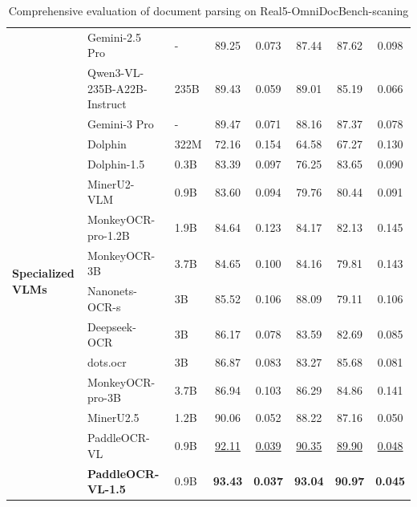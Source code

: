 \documentclass[11pt, a4paper,logo,  copyright, nonumbering]{paddleocr}
\begin{document}
\begin{table}[H]
{\begin{tabular}{l|ll|c|c c c c}
         & Gemini-2.5 Pro~\cite{gemini25} & - & 89.25 & 0.073 & 87.44 & 87.62 & 0.098 \\
         & Qwen3-VL-235B-A22B-Instruct~\cite{bai2025qwen2} & 235B & 89.43 & 0.059 & 89.01 & 85.19 & 0.066 \\
         & Gemini-3 Pro~\cite{gemini30} & - & 89.47 & 0.071 & 88.16 & 87.37 & 0.078 \\
        \midrule
        \multirow{10}{*}{\textbf{Specialized VLMs}} & Dolphin~\cite{feng2025dolphin} & 322M & 72.16 & 0.154 & 64.58 & 67.27 & 0.130 \\
         & Dolphin-1.5 ~\cite{feng2025dolphin} & 0.3B & 83.39 & 0.097 & 76.25 & 83.65 & 0.090 \\
         & MinerU2-VLM~\cite{MinerU2} & 0.9B & 83.60 & 0.094 & 79.76 & 80.44 & 0.091 \\
         & MonkeyOCR-pro-1.2B ~\cite{li2025monkeyocr} & 1.9B & 84.64 & 0.123 & 84.17 & 82.13 & 0.145 \\
         & MonkeyOCR-3B ~\cite{li2025monkeyocr} & 3.7B & 84.65 & 0.100 & 84.16 & 79.81 & 0.143 \\
         & Nanonets-OCR-s~\cite{Nanonets-OCR-S} & 3B & 85.52 & 0.106 & 88.09 & 79.11 & 0.106 \\
         & Deepseek-OCR~\cite{wei2025deepseek} & 3B & 86.17 & 0.078 & 83.59 & 82.69 & 0.085 \\
         & dots.ocr~\cite{dotsocr} & 3B & 86.87 & 0.083 & 83.27 & 85.68 & 0.081 \\
         & MonkeyOCR-pro-3B ~\cite{li2025monkeyocr} & 3.7B & 86.94 & 0.103 & 86.29 & 84.86 & 0.141 \\
         & MinerU2.5~\cite{niu2025mineru2} & 1.2B & 90.06 & 0.052 & 88.22 & 87.16 & 0.050 \\
         & PaddleOCR-VL~\cite{cui2025paddleocrvl} & 0.9B & \cellcolor{cyan!15}\underline{92.11} & \cellcolor{cyan!15}\underline{0.039} & \cellcolor{cyan!15}\underline{90.35} & \cellcolor{cyan!15}\underline{89.90} & \cellcolor{cyan!15}\underline{0.048} \\ 
         & \textbf{PaddleOCR-VL-1.5} & 0.9B & \cellcolor{red!15}\textbf{93.43} & \cellcolor{red!15}\textbf{0.037} & \cellcolor{red!15}\textbf{93.04} & \cellcolor{red!15}\textbf{90.97} & \cellcolor{red!15}\textbf{0.045} \\
        \bottomrule
    \end{tabular}%
    }
    \caption{Comprehensive evaluation of document parsing on Real5-OmniDocBench-scaning}
    \label{tab:ocr_performance_scaning}
\end{table}
\end{document}
